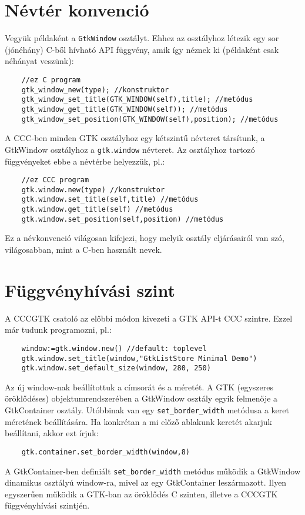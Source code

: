 \section{Névtér konvenció}

Vegyük példaként a \verb!GtkWindow! osztályt. 
Ehhez az osztályhoz létezik egy sor (jónéhány) C-ből hívható
API függvény, amik így néznek ki (példaként csak néhányat veszünk):

\begin{verbatim}
    //ez C program
    gtk_window_new(type); //konstruktor
    gtk_window_set_title(GTK_WINDOW(self),title); //metódus
    gtk_window_get_title(GTK_WINDOW(self)); //metódus
    gtk_window_set_position(GTK_WINDOW(self),position); //metódus
\end{verbatim}

A CCC-ben minden GTK osztályhoz egy kétszintű névteret
társítunk, a GtkWindow osztályhoz a \verb!gtk.window! névteret.
Az osztályhoz tartozó függvényeket ebbe a névtérbe helyezzük, pl.:

\begin{verbatim}
    //ez CCC program
    gtk.window.new(type) //konstruktor
    gtk.window.set_title(self,title) //metódus
    gtk.window.get_title(self) //metódus
    gtk.window.set_position(self,position) //metódus
\end{verbatim}
Ez a névkonvenció világosan kifejezi,
hogy melyik osztály eljárásairól van szó,
világosabban, mint a C-ben használt nevek.


\section{Függvényhívási szint}

A CCCGTK csatoló az előbbi módon kivezeti a GTK API-t
CCC szintre. Ezzel már tudunk programozni, pl.:
\begin{verbatim}
    window:=gtk.window.new() //default: toplevel
    gtk.window.set_title(window,"GtkListStore Minimal Demo")
    gtk.window.set_default_size(window, 280, 250)
\end{verbatim}
Az új window-nak beállítottuk a címsorát és a méretét.
A GTK (egyszeres öröklődéses) objektumrendszerében 
a GtkWindow osztály egyik felmenője a GtkContainer osztály.
Utóbbinak van egy \verb!set_border_width! metódusa
a keret méretének beállítására. Ha konkrétan a mi előző
ablakunk keretét akarjuk beállítani, akkor ezt írjuk:
\begin{verbatim}
    gtk.container.set_border_width(window,8)
\end{verbatim}
A GtkContainer-ben
definiált \verb!set_border_width! metódus működik a 
GtkWindow dinamikus osztályú window-ra, 
mivel az egy GtkContainer leszármazott.
Ilyen egyszerűen működik a GTK-ban az öröklődés C szinten, illetve
a CCCGTK függvényhívási szintjén.


